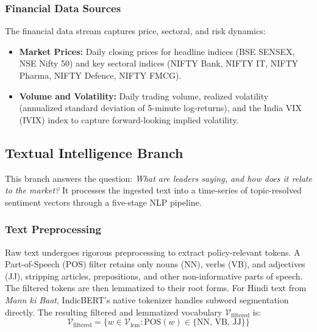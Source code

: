 \documentclass[11pt]{article}
\begin{document}
\subsubsection{Financial Data Sources}
The financial data stream captures price, sectoral, and risk dynamics:
\begin{itemize}[leftmargin=*, itemsep=0pt, topsep=4pt]
    \item \textbf{Market Prices:} Daily closing prices for headline indices (BSE SENSEX, NSE Nifty 50) and key sectoral indices (NIFTY Bank, NIFTY IT, NIFTY Pharma, NIFTY Defence, NIFTY FMCG).
    \item \textbf{Volume and Volatility:} Daily trading volume, realized volatility (annualized standard deviation of 5-minute log-returns), and the India VIX (IVIX) index to capture forward-looking implied volatility.
\end{itemize}

\subsection{Textual Intelligence Branch}
This branch answers the question: \textit{What are leaders saying, and how does it relate to the market?} It processes the ingested text into a time-series of topic-resolved sentiment vectors through a five-stage NLP pipeline.

\subsubsection{Text Preprocessing}
Raw text undergoes rigorous preprocessing to extract policy-relevant tokens. A Part-of-Speech (POS) filter retains only nouns (NN), verbs (VB), and adjectives (JJ), stripping articles, prepositions, and other non-informative parts of speech. The filtered tokens are then lemmatized to their root forms. For Hindi text from \textit{Mann ki Baat}, IndicBERT's native tokenizer handles subword segmentation directly. The resulting filtered and lemmatized vocabulary $\mathcal{V}_{\text{filtered}}$ is:
\begin{equation}
\mathcal{V}_{\text{filtered}} = \{w \in \mathcal{V}_{\text{lem}} : \text{POS}(w) \in \{\text{NN, VB, JJ}\}\}
\label{eq:pos_filter}
\end{equation}
\end{document}
